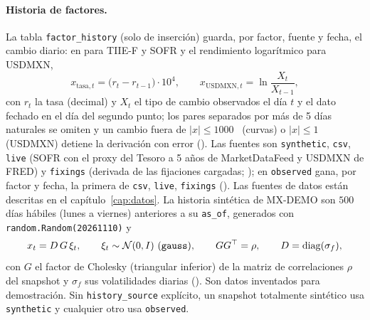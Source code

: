 \paragraph{Historia de factores.} La tabla \texttt{factor\_history} (solo de inserción) guarda, por factor, fuente y fecha, el cambio diario: en \pb{} para TIIE-F y SOFR y el rendimiento logarítmico para USDMXN,
\begin{equation}\label{eq:cap09-cambios}
  x_{\mathrm{tasa},t}=\bigl(r_t-r_{t-1}\bigr)\cdot10^{4},\qquad
  x_{\mathrm{USDMXN},t}=\ln\frac{X_t}{X_{t-1}},
\end{equation}
con $r_t$ la tasa (decimal) y $X_t$ el tipo de cambio observados el día $t$ y el dato fechado en el día del segundo punto; los pares separados por más de 5 días naturales se omiten y un cambio fuera de $|x|\le1000$~\pb{} (curvas) o $|x|\le1$ (USDMXN) detiene la derivación con error (). Las fuentes son \texttt{synthetic}, \texttt{csv}, \texttt{live} (SOFR con el proxy del Tesoro a 5 años de MarketDataFeed y USDMXN de FRED) y \texttt{fixings} (derivada de las fijaciones cargadas; ); en \texttt{observed} gana, por factor y fecha, la primera de \texttt{csv}, \texttt{live}, \texttt{fixings} (). Las fuentes de datos están descritas en el capítulo~\ref{cap:datos}. La historia sintética de MX-DEMO son $500$ días hábiles (lunes a viernes) anteriores a su \texttt{as\_of}, generados con \texttt{random.Random(20261110)} y
\begin{equation}\label{eq:cap09-sintetica}
  x_t=D\,G\,\xi_t,\qquad \xi_t\sim\mathcal N(0,I)\ \text{(\texttt{gauss})},\qquad GG^{\top}=\rho,\qquad D=\mathrm{diag}(\sigma_f),
\end{equation}
con $G$ el factor de Cholesky (triangular inferior) de la matriz de correlaciones $\rho$ del snapshot y $\sigma_f$ sus volatilidades diarias (). Son datos inventados para demostración. Sin \texttt{history\_source} explícito, un snapshot totalmente sintético usa \texttt{synthetic} y cualquier otro usa \texttt{observed}.

